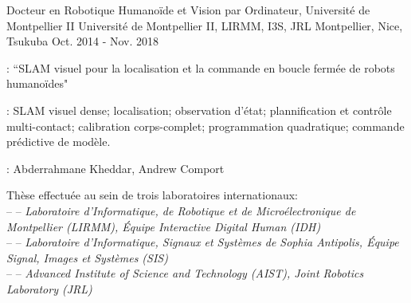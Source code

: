 

\begin{cventries}

  \cventry
    {Docteur en Robotique Humanoïde et Vision par Ordinateur, Université de Montpellier II} %
    {Université de Montpellier II, LIRMM, I3S, JRL} %
    {Montpellier, Nice, Tsukuba} %
    {Oct. 2014 - Nov. 2018} %
    {
      \begin{cvitems} %
        \item {} : ``SLAM visuel pour la localisation et la commande en boucle fermée de robots humanoïdes"
        \item {}: SLAM visuel dense; localisation; observation d'état; plannification et contrôle multi-contact; calibration corps-complet; programmation quadratique; commande prédictive de modèle.
        \item {}: Abderrahmane Kheddar, Andrew Comport 
        \item Thèse effectuée au sein de trois laboratoires internationaux:\\
        --  -- \emph{Laboratoire d'Informatique, de Robotique et de Microélectronique de Montpellier (LIRMM), Équipe Interactive Digital Human (IDH)}\\
          --  -- \emph{Laboratoire d'Informatique, Signaux et Systèmes de Sophia Antipolis, Équipe Signal, Images et Systèmes (SIS)}\\
          --  -- \emph{Advanced Institute of Science and Technology (AIST), Joint Robotics Laboratory (JRL)}
      \end{cvitems}
    }


\end{cventries}
